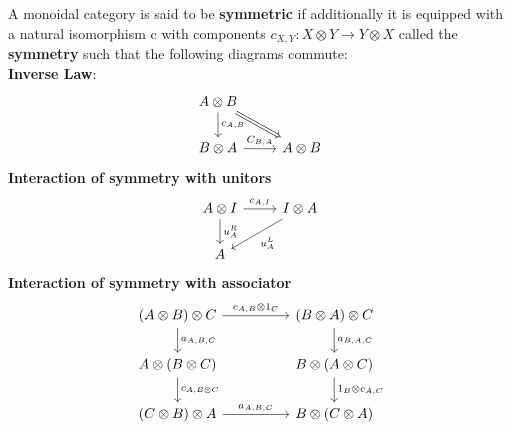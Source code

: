 \documentclass[11pt, oneside]{amsart}
\theoremstyle{definition}
\theoremstyle{definition}
\begin{document}
A monoidal category is said to be \textbf{symmetric} if additionally it is equipped with a natural isomorphism c with components $c_{X,Y}: {X}\otimes{Y} \to {Y}\otimes{X}$ called the \textbf{symmetry} such that
the following diagrams commute:\\

\textbf{Inverse Law}:
\begin{equation*}
\begin{tikzcd}
{A}\otimes{B} \arrow[d, "{c_{A,B}}"] \arrow[rd, Rightarrow] &             \\
B\otimes{A} \arrow[r, "{C_{B,A}}"]                          & A\otimes{B}
\end{tikzcd}
\end{equation*}
\textbf{Interaction of symmetry with unitors}
\begin{equation*}
\begin{tikzcd}
A\otimes{I} \arrow[r, "{c_{A,I}}"] \arrow[d, "{u^{R}_A}"] & I\otimes{A} \arrow[ld, "{u^{L}_{A}}"] \\
A                                                         &                                      
\end{tikzcd}
\end{equation*}
\textbf{Interaction of symmetry with associator}
\begin{equation*}
\begin{tikzcd}
(A\otimes{B})\otimes{C} \arrow[d, "{a_{A,B,C}}"] \arrow[rr, "{c_{A,B}\otimes{1_{C}}}"] &  & ({B}\otimes{A)}\otimes{C} \arrow[d, "{a_{B,A,C}}"]             \\
A\otimes({B}\otimes{C}) \arrow[d, "{c_{A,{B\otimes{C}}}}"]                             &  & {B}\otimes({A}\otimes{C}) \arrow[d, "{1_{B}\otimes{c_{A,C}}}"] \\
(C\otimes{B})\otimes{A} \arrow[rr, "{a_{A,B,C}}"]                                      &  & {B}\otimes({C}\otimes{A})                                     
\end{tikzcd}
\end{equation*}
\end{document}
